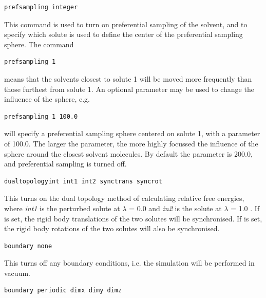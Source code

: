 \documentclass[letterpaper,10pt,english]{sphinxmanual}
\begin{document}
\begin{Verbatim}[commandchars=\\\{\}]
prefsampling integer
\end{Verbatim}

This command is used to turn on preferential sampling of the solvent, and to specify which solute is used to define the center of the preferential sampling sphere. The command

\begin{Verbatim}[commandchars=\\\{\}]
prefsampling 1
\end{Verbatim}

means that the solvents closest to solute 1 will be moved more frequently than those furthest from solute 1. An optional parameter may be used to change the influence of the sphere, e.g.

\begin{Verbatim}[commandchars=\\\{\}]
prefsampling 1 100.0
\end{Verbatim}

will specify a preferential sampling sphere centered on solute 1, with a parameter of 100.0. The larger the parameter, the more highly focussed the influence of the sphere around the closest solvent molecules. By default the parameter is 200.0, and preferential sampling is turned off.

\begin{Verbatim}[commandchars=\\\{\}]
dualtopologyint int1 int2 synctrans syncrot
\end{Verbatim}

This turns on the dual topology method of calculating relative free energies, where \emph{int1} is the perturbed solute at \(\lambda\) = 0.0 and \emph{in2} is the solute at \(\lambda\) = 1.0 . If  is set, the rigid body translations of the two solutes will be synchronised. If  is set, the rigid body rotations of the two solutes will also be synchronised.

\begin{Verbatim}[commandchars=\\\{\}]
boundary none
\end{Verbatim}

This turns off any boundary conditions, i.e. the simulation will be performed in vacuum.

\begin{Verbatim}[commandchars=\\\{\}]
boundary periodic dimx dimy dimz
\end{Verbatim}
\end{document}
